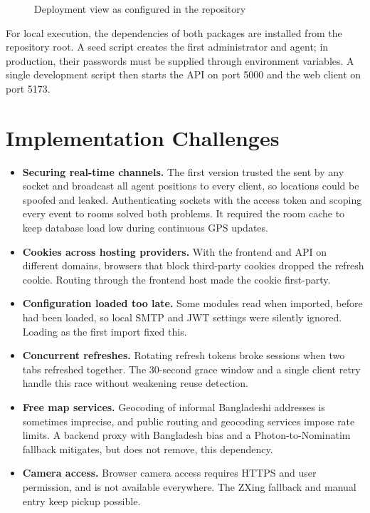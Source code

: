 \begin{figure}[htbp]
\centering
\resizebox{\textwidth}{!}{}
\caption{Deployment view as configured in the repository}
\label{fig:deployment}
\end{figure}

For local execution, the dependencies of both packages are installed from the repository root. A seed script creates the first administrator and agent; in production, their passwords must be supplied through environment variables. A single development script then starts the API on port 5000 and the web client on port 5173.

\section{Implementation Challenges}
\label{sec:challenges}

\begin{itemize}
  \item \textbf{Securing real-time channels.} The first version trusted the  sent by any socket and broadcast all agent positions to every client, so locations could be spoofed and leaked. Authenticating sockets with the access token and scoping every event to rooms solved both problems. It required the room cache to keep database load low during continuous GPS updates.
  \item \textbf{Cookies across hosting providers.} With the frontend and API on different domains, browsers that block third-party cookies dropped the refresh cookie. Routing  through the frontend host made the cookie first-party.
  \item \textbf{Configuration loaded too late.} Some modules read  when imported, before  had been loaded, so local SMTP and JWT settings were silently ignored. Loading  as the first import fixed this.
  \item \textbf{Concurrent refreshes.} Rotating refresh tokens broke sessions when two tabs refreshed together. The 30-second grace window and a single client retry handle this race without weakening reuse detection.
  \item \textbf{Free map services.} Geocoding of informal Bangladeshi addresses is sometimes imprecise, and public routing and geocoding services impose rate limits. A backend proxy with Bangladesh bias and a Photon-to-Nominatim fallback mitigates, but does not remove, this dependency.
  \item \textbf{Camera access.} Browser camera access requires HTTPS and user permission, and  is not available everywhere. The ZXing fallback and manual entry keep pickup possible.
\end{itemize}

